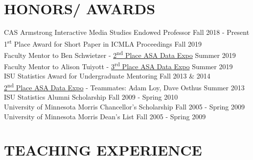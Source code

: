 \documentclass[margin, 10pt]{res}\usepackage[]{graphicx}\usepackage[]{color}
\begin{document}
\begin{resume}
  
\section{HONORS/ AWARDS} 
CAS Armstrong Interactive Media Studies Endowed Professor \hfill Fall 2018 - Present \\
1\textsuperscript{st} Place Award for Short Paper in ICMLA Proceedings \hfill Fall 2019\\
Faculty Mentor to Ben Schwietzer - \href{https://community.amstat.org/governmentstatisticssection/awards/dataexpo}{2\textsuperscript{nd} Place ASA Data Expo} \hfill Summer 2019\\
Faculty Mentor to Alison Tuiyott - \href{https://community.amstat.org/governmentstatisticssection/awards/dataexpo}{3\textsuperscript{rd} Place ASA Data Expo} \hfill Summer 2019\\
ISU Statistics Award for Undergraduate Mentoring \hfill Fall 2013 \& 2014 \\
\href{http://stat-computing.org/dataexpo/2013/}{2\textsuperscript{nd} Place ASA Data Expo} - Teammates: Adam Loy, Dave Osthus \hfill Summer 2013 \\
ISU Statistics Alumni Scholarship  \hfill Fall 2009 - Spring 2010 \\ 
University of Minnesota Morris Chancellor's Scholarship  \hfill Fall 2005 - Spring 2009 \\
University of Minnesota Morris Dean's List  \hfill  Fall 2005 - Spring 2009 

  
\section{TEACHING EXPERIENCE}


\end{resume}
\end{document}
